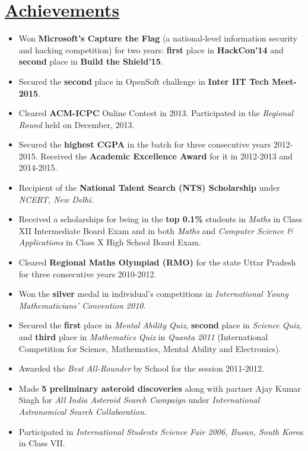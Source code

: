 \documentclass[9pt]{extarticle}
\newcommand{\heading}[1]{
\section*{\color{red}\underline{#1}}
}
\begin{document}
\heading{Achievements}

\begin{itemize}
\item Won \textbf{Microsoft's Capture the Flag} (a national-level information security and hacking competition) for two years: \textbf{first} place in \textbf{HackCon'14} and \textbf{second} place in \textbf{Build the Shield'15}.

\item Secured the \textbf{second} place in OpenSoft challenge in \textbf{Inter IIT Tech Meet-2015}.

\item Cleared \textbf{ACM-ICPC} Online Contest in 2013. Participated in the \textit{Regional Round} held on December, 2013.

\item Secured the \textbf{highest CGPA} in the batch for three consecutive years 2012-2015. Received the \textbf{Academic Excellence Award} for it in 2012-2013 and 2014-2015.

\item Recipient of the \textbf{National Talent Search (NTS) Scholarship} under \textit{NCERT, New Delhi}.

\item Received a scholarships for being in the \textbf{top 0.1\%} students in \textit{Maths} in Class XII Intermediate Board Exam and in both \textit{Maths} and \textit{Computer Science \& Applications} in Class X High School Board Exam.

\item Cleared \textbf{Regional Maths Olympiad (RMO)} for the state Uttar Pradesh for three consecutive years 2010-2012.

\item Won the \textbf{silver} medal in individual’s competitions in \textit{International Young Mathematicians’ Convention 2010}.

\item Secured the \textbf{first} place in \textit{Mental Ability Quiz}, \textbf{second} place in \textit{Science Quiz}, and \textbf{third} place in \textit{Mathematics Quiz} in \textit{Quanta 2011} (International Competition for Science, Mathematics, Mental Ability and Electronics).

\item Awarded the \textit{Best All-Rounder} by School for the session 2011-2012.
\item Made \textbf{5 preliminary asteroid discoveries} along with partner Ajay Kumar Singh for \textit{All India Asteroid Search Campaign} under \textit{International Astronomical Search Collaboration}.

\item Participated in \textit{International Students Science Fair 2006, Busan, South Korea} in Class VII.
\end{itemize}
\end{document}
